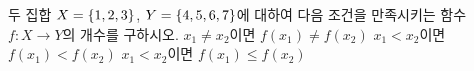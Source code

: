 두 집합 $X=\{1{,}\mkern3mu\mathopen{}2{,}\mkern3mu\mathopen{}3\}$, $Y=\{4{,}\mkern3mu\mathopen{}5{,}\mkern3mu\mathopen{}6{,}\mkern3mu\mathopen{}7\}$에 대하여 다음 조건을 만족시키는 함수 $f:X\longrightarrow Y$의 개수를 구하시오. 
 $x_1\ne x_2$이면 $f(x_1)\ne f(x_2)$
 $x_1<x_2$이면 $f(x_1)<f(x_2)$
 $x_1<x_2$이면 $f(x_1)\le f(x_2)$
